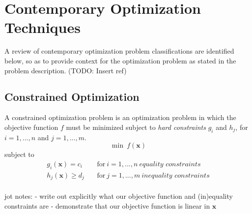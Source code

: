 \documentclass[../mthe-493-final-project.tex]{subfiles}
\begin{document}
    \chapter{Contemporary Optimization Techniques}
    \label{ch:contemporary-optimization}
    
    A review of contemporary optimization problem classifications are identified below, so as to provide context for the optimization problem as stated in the problem description. (TODO: Insert ref)
    


    
    \section{Constrained Optimization}
    \label{sec:Constrained Optimization}
    
    A constrained optimization problem is an optimization problem in which the objective function $f$ must be minimized subject to \textit{hard constraints} $g_i$ and $h_j$, for $i=1,...,n$ and $j=1,...,m$.
    \[ \min \ f(\mathbf{x}) \]
    subject to
    \begin{align*}
        g_i(\mathbf{x}) = c_i & \ & \text{for} \ i = 1,...,n \ \textit{equality constraints} \\
        h_j(\mathbf{x}) \geq d_j & \ & \text{for} \ j = 1,...,m \ \textit{inequality constraints} \\
    \end{align*}
    
    jot notes:
    - write out explicitly what our objective function and (in)equality constraints are
    - demonstrate that our objective function is linear in $\mathbf{x}$
    
\end{document}
